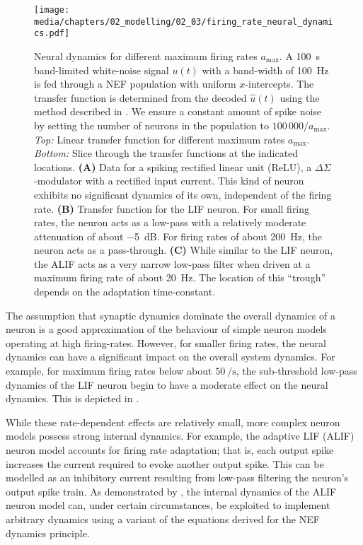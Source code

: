 \begin{figure}[t]
	\texttt{[image: media/chapters/02\_modelling/02\_03/firing\_rate\_neural\_dynamics.pdf]}
	\caption[Neural dynamics for different maximum firing rates]{Neural dynamics for different maximum firing rates $a_\mathrm{max}$. A \SI{100}{\second} band-limited white-noise signal $u(t)$ with a band-width of \SI{100}{\hertz} is fed through a NEF population with uniform $x$-intercepts.
	The transfer function is determined from the decoded $\hat u(t)$ using the method described in \citet[Section~4.3.3]{eliasmith2003neural}.
	We ensure a constant amount of spike noise by setting the number of neurons in the population to $100\,000 / a_\mathrm{max}$. \emph{Top:} Linear transfer function for different maximum rates $a_\mathrm{max}$. \emph{Bottom:} Slice through the transfer functions at the indicated locations.
	\textbf{(A)} Data for a spiking rectified linear unit (ReLU), a $\Delta\Sigma$-modulator with a rectified input current. This kind of neuron exhibits no significant dynamics of its own, independent of the firing rate. \textbf{(B)} Transfer function for the LIF neuron. For small firing rates, the neuron acts as a low-pass with a relatively moderate attenuation of about \SI{-5}{\deci\bel}. For firing rates of about \SI{200}{\hertz}, the neuron acts as a pass-through. \textbf{(C)} While similar to the LIF neuron, the ALIF
	acts as a very narrow low-pass filter when driven at a maximum firing rate of about \SI{20}{\hertz}. The location of this \enquote{trough} depends on the adaptation time-constant.}
	\label{fig:neural_dynamics_firing_rates}
\end{figure}

The assumption that synaptic dynamics dominate the overall dynamics of a neuron is a good approximation of the behaviour of simple neuron models operating at high firing-rates.
However, for smaller firing rates, the neural dynamics can have a significant impact on the overall system dynamics.
For example, for maximum firing rates below about $\SI{50}{\per\second}$, the sub-threshold low-pass dynamics of the LIF neuron begin to have a moderate effect on the neural dynamics.
This is depicted in .

While these rate-dependent effects are relatively small, more complex neuron models possess strong internal dynamics.
For example, the adaptive LIF (ALIF) neuron model \citep[Chapter~14]{koch1999biophysics} accounts for firing rate adaptation; that is, each output spike increases the current required to evoke another output spike.
This can be modelled as an inhibitory current resulting from low-pass filtering the neuron's output spike train.
As demonstrated by \citet[Chapter~7]{tripp2009search}, the internal dynamics of the ALIF neuron model can, under certain circumstances, be exploited to implement arbitrary dynamics using a variant of the equations derived for the NEF dynamics principle.

